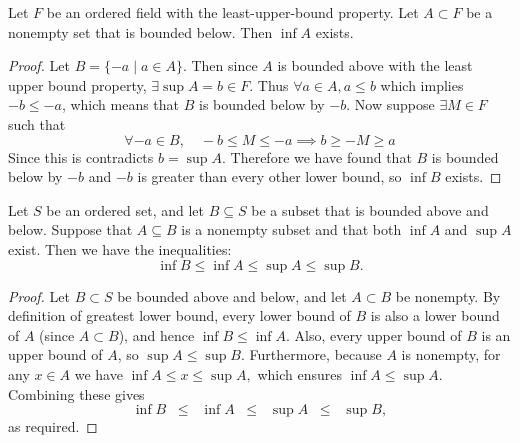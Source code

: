 \documentclass[../main.tex]{subfiles}
\begin{document}
\begin{proposition} \label{prop:infimum_exists}
Let \( F \) be an ordered field with the least-upper-bound property. Let \( A \subset F \) be a nonempty set that is bounded below. Then \( \inf A \) exists.
\end{proposition}




\begin{proof}
Let $ B = \{-a \mid a \in A \}$. Then since $A$ is bounded above with the least upper bound property, $ \exists \sup{A}=b \in F$. Thus $ \forall a \in A, a \leq b$ which implies $ -b \leq -a$, which means that $B$ is bounded below by $-b$. Now suppose $\exists M \in F$ such that 
\[ 
\forall -a \in B, \quad -b \leq M \leq -a \implies b \geq -M \geq a 
\]
Since this is contradicts $ b = \sup{A}$. Therefore we have found that $B$ is bounded below by $-b$ and $-b$ is greater than every other lower bound, so $\inf{B}$ exists. 

 
\end{proof}

















\begin{exercise} \label{ex:bounds_of_inf_sup}
Let \( S \) be an ordered set, and let \( B \subseteq S \) be a subset that is bounded above and below. Suppose that \( A \subseteq B \) is a nonempty subset and that both \( \inf A \) and \( \sup A \) exist. Then we have the inequalities:
\[
\inf B \leq \inf A \leq \sup A \leq \sup B.
\]
\end{exercise}

\begin{proof}
Let \(B\subset S\) be bounded above and below, and let \(A\subset B\) be nonempty. By definition of greatest lower bound, every lower bound of \(B\) is also a lower bound of \(A\) (since \(A\subset B\)), and hence \(\inf B\le \inf A.\) Also, every upper bound of \(B\) is an upper bound of \(A\), so \(\sup A\le \sup B.\)  
Furthermore, because \(A\) is nonempty, for any \(x\in A\) we have \(\inf A \le x\le \sup A,\) which ensures \(\inf A\le \sup A.\) Combining these gives
\[
\inf B \;\;\le\;\; \inf A \;\;\le\;\; \sup A \;\;\le\;\; \sup B,
\]
as required.
\end{proof}
\end{document}
